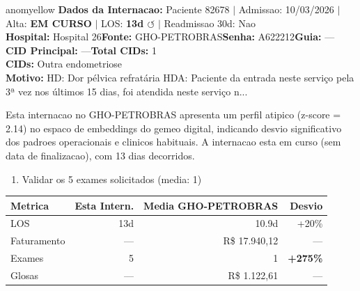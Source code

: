 \documentclass[a4paper,10pt]{article}
\begin{document}
\newpage

\begin{anomalycard}[Internacao 168364 | GHO-PETROBRAS | MODERADO (z=2.14)]{anomyellow}
\textbf{Dados da Internacao:} Paciente 82678 $\mid$ Admissao: 10/03/2026 $\mid$ Alta: \textcolor{anomorange}{\textbf{EM CURSO}} $\mid$ LOS: \textbf{13d \textcolor{anomorange}{$\circlearrowleft$}} $\mid$ Readmissao 30d: Nao\\
\textbf{Hospital:} Hospital 26\quad\textbf{Fonte:} GHO-PETROBRAS\quad\textbf{Senha:} A622212\quad\textbf{Guia:} ---\\
\textbf{CID Principal:} {\small ---}\quad\textbf{Total CIDs:} 1\\

\textbf{CIDs:} {\scriptsize Outra endometriose}\\

\textbf{Motivo:} {\scriptsize HD: Dor pélvica refratária  HDA: Paciente da entrada neste serviço pela 3ª vez nos últimos 15 dias, foi atendida neste serviço n...}\\

\vspace{2pt}\begin{tcolorbox}[colback=severityred!20,colframe=anomyellow,title={\textbf{Interpretacao de Negocio}},fonttitle=\bfseries\small,left=4pt,right=4pt,top=3pt,bottom=3pt]
{\small Esta internacao no GHO-PETROBRAS apresenta um perfil atipico (z-score = 2.14) no espaco de embeddings do gemeo digital, indicando desvio significativo dos padroes operacionais e clinicos habituais. A internacao esta em curso (sem data de finalizacao), com 13 dias decorridos.}
\end{tcolorbox}
\begin{tcolorbox}[colback=severityyellow!30,colframe=anomorange,title={\textbf{Recomendacoes Especificas}},fonttitle=\bfseries\small,left=4pt,right=4pt,top=3pt,bottom=3pt]
\begin{enumerate}[nosep,leftmargin=16pt]
\item {\small Validar os 5 exames solicitados (media: 1)}
\end{enumerate}
\end{tcolorbox}
\begin{center}\begin{tabular}{l r r r}\toprule\textbf{Metrica} & \textbf{Esta Intern.} & \textbf{Media GHO-PETROBRAS} & \textbf{Desvio} \\\midrule
LOS & 13d & 10.9d & +20\% \\
Faturamento & --- & R\$ 17.940,12 & --- \\
Exames & 5 & 1 & \textcolor{anomred}{\textbf{+275\%}} \\
Glosas & --- & R\$ 1.122,61 & --- \\
\bottomrule\end{tabular}\end{center}


\end{anomalycard}
\end{document}
